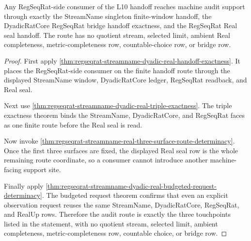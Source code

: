 \begin{theorem}
\label{thm:regseqrat-streamname-real-audit-clean-route-triad}
Any RegSeqRat-side consumer of the L10 handoff reaches machine audit support
through exactly the StreamName singleton finite-window handoff, the
DyadicRatCore RegSeqRat bridge handoff exactness, and the RegSeqRat Real seal
handoff. The route has no quotient stream, selected limit, ambient Real
completeness, metric-completeness row, countable-choice row, or bridge row.
\end{theorem}
\begin{proof}
First apply
\autoref{thm:regseqrat-streamname-dyadic-real-handoff-exactness}. It places
the RegSeqRat-side consumer on the finite handoff route through the displayed
StreamName window, DyadicRatCore ledger, RegSeqRat readback, and Real seal.

Next use \autoref{thm:regseqrat-streamname-dyadic-real-triple-exactness}.
The triple exactness theorem binds the StreamName, DyadicRatCore, and
RegSeqRat faces as one finite route before the Real seal is read.

Now invoke
\autoref{thm:regseqrat-streamname-real-three-surface-route-determinacy}. Once
the first three surfaces are fixed, the displayed Real seal row is the whole
remaining route coordinate, so a consumer cannot introduce another
machine-facing support site.

Finally apply
\autoref{thm:regseqrat-streamname-dyadic-real-budgeted-request-determinacy}.
The budgeted request theorem confirms that even an explicit observation
request reuses the same StreamName, DyadicRatCore, RegSeqRat, and RealUp
rows. Therefore the audit route is exactly the three touchpoints listed in
the statement, with no quotient stream, selected limit, ambient completeness,
metric-completeness row, countable choice, or bridge row.
\end{proof}
